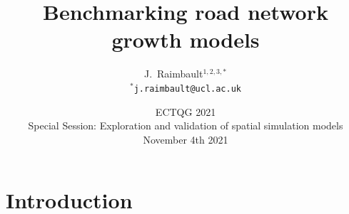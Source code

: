 






\title[Benchmarking road network growth models]{Benchmarking road network growth models}

\author[Raimbault]{J.~Raimbault$^{1,2,3,\ast}$\\\medskip
$^{\ast}$\texttt{j.raimbault@ucl.ac.uk}
}



\date[04/11/2021]{ECTQG 2021\\
Special Session: Exploration and validation of spatial simulation models\\
November 4th 2021
}

\frame{\maketitle}



\section{Introduction}



\sframe{}{


}



